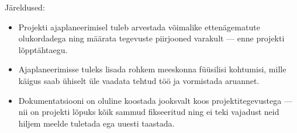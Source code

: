 Järeldused:

\begin{itemize}
    \item Projekti ajaplaneerimisel tuleb arvestada võimalike ettenägematute olukordadega ning määrata tegevuste piirjooned varakult –-- enne projekti lõpptähtaegu.
    \item Ajaplaneerimisse tuleks lisada rohkem meeskonna füüsilisi kohtumisi, mille käigus saab ühiselt üle vaadata tehtud töö ja vormistada aruannet.
    \item Dokumentatsiooni on oluline koostada jooksvalt koos projektitegevustega --– nii on projekti lõpuks kõik sammud fikseeritud ning ei teki vajadust neid hiljem meelde tuletada ega uuesti taastada.

\end{itemize}
